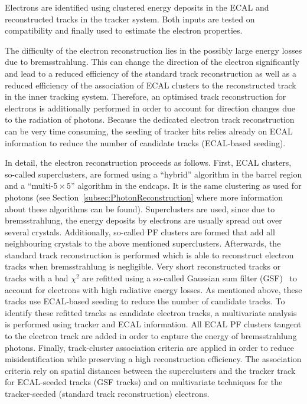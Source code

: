 Electrons are identified using clustered energy deposits in the ECAL and reconstructed tracks in the tracker system. 
Both inputs are tested on compatibility and finally used to estimate the electron properties. 

The difficulty of the electron reconstruction lies in the possibly large energy losses due to bremsstrahlung.
This can change the direction of the electron significantly and lead to a reduced efficiency of the standard track reconstruction as well as a reduced efficiency of the association of ECAL clusters to the reconstructed track in the inner tracking system.
Therefore, an optimised track reconstruction for electrons is additionally performed in order to account for direction changes due to the radiation of photons.
Because the dedicated electron track reconstruction can be very time consuming, the seeding of tracker hits relies already on ECAL information to reduce the number of candidate tracks (ECAL-based seeding).

In detail, the electron reconstruction proceeds as follows.
First, ECAL clusters, so-called superclusters, are formed using a ``hybrid'' algorithm in the barrel region and a ``multi-$5\times 5$'' algorithm in the endcaps.
It is the same clustering as used for photons (see Section~\ref{subsec:PhotonReconstruction} where more information about these algorithms can be found).
Superclusters are used, since due to bremsstrahlung, the energy deposits by electrons are usually spread out over several crystals.
Additionally, so-called PF clusters are formed that add all neighbouring crystals to the above mentioned superclusters. 
Afterwards, the standard track reconstruction is performed which is able to reconstruct electron tracks when bremsstrahlung is negligible.
Very short reconstructed tracks or tracks with a bad $\chi^2$ are refitted using a so-called Gaussian sum filter (GSF)~\cite{bib:GSF_2003} to account for electrons with high radiative energy losses.
As mentioned above, these tracks use ECAL-based seeding to reduce the number of candidate tracks.  
To identify these refitted tracks as candidate electron tracks, a multivariate analysis is performed using tracker and ECAL information.
All ECAL PF clusters tangent to the electron track are added in order to capture the energy of bremsstrahlung photons.
Finally, track-cluster association criteria are applied in order to reduce misidentification while preserving a high reconstruction efficiency.
The association criteria rely on spatial distances between the superclusters and the tracker track for ECAL-seeded tracks (GSF tracks) and on multivariate techniques for the tracker-seeded (standard track reconstruction) electrons.

